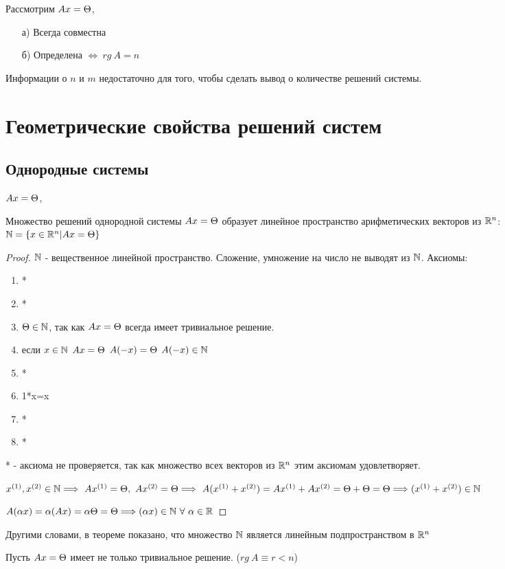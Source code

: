 Рассмотрим $Ax=\Theta$, 
\begin{itemize}
\item[а)] Всегда совместна
\item[б)] Определена $\Longleftrightarrow\ rg\ A=n$
\end{itemize}
Информации о $n$ и $m$ недостаточно для того, чтобы сделать вывод о количестве решений системы.
\chapter{Геометрические свойства решений систем}
\section{Однородные системы}
$Ax=\Theta$, 
\begin{theor}Множество решений однородной системы $Ax=\Theta$ образует линейное пространство арифметических векторов из $\mathbb{R}^n$: $\mathbb{N}=\left\{x\in\mathbb{R}^n|Ax=\Theta\right\}$
\end{theor}
\begin{proof}
$\mathbb{N}$ - вещественное линейной пространство. Сложение, умножение на число не выводят из $\mathbb{N}$.
Аксиомы:\begin{enumerate}
\item *
\item *
\item $\Theta\in\mathbb{N}$, так как $Ax=\Theta$ всегда имеет тривиальное решение.
\item если $x\in\mathbb{N}$ $Ax=\Theta$ \then $A(-x)=\Theta$ \then $A(-x)\in\mathbb{N}$
\item *
\item 1*x=x
\item *
\item *
\end{enumerate}
* - аксиома не проверяется, так как множество всех векторов из $\mathbb{R}^n$ этим аксиомам удовлетворяет.

$x^{(1)},x^{(2)}\in\N\Longrightarrow\ Ax^{(1)}=\T,\ Ax^{(2)}=\T\Longrightarrow\ A(x^{(1)}+x^{(2)})=Ax^{(1)}+Ax^{(2)}=\T+\T=\T\Longrightarrow (x^{(1)}+x^{(2)})\in\N$

$A(\alpha x)=\alpha(Ax)=\alpha\T=\T\Longrightarrow (\alpha x)\in\N\ \forall\ \alpha \in \R$
\end{proof}
\begin{remark}
Другими словами, в теореме показано, что множество $\mathbb{N}$ является линейным подпространством в $\mathbb{R}^n$
\end{remark}
Пусть $Ax=\Theta$ имеет не только тривиальное решение. ($rg\ A\equiv r<n$)
